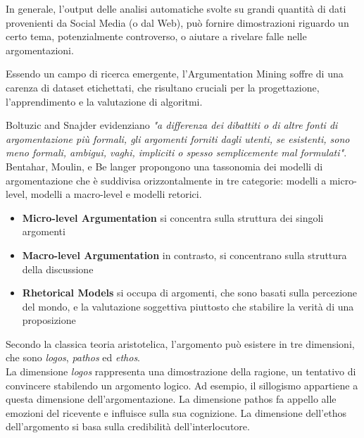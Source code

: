 In generale, l'output delle analisi automatiche svolte su grandi quantità di dati provenienti da Social Media (o dal Web), può fornire dimostrazioni riguardo un certo tema, potenzialmente controverso, o aiutare a rivelare falle nelle argomentazioni.

Essendo un campo di ricerca emergente, l'Argumentation Mining soffre di una carenza di dataset etichettati, che risultano cruciali per la progettazione, l'apprendimento e la valutazione di algoritmi. 



Boltuzic  and Snajder \cite{boltuvzic2014} evidenziano \textit{"a differenza dei dibattiti o di altre fonti di argomentazione più formali, gli argomenti forniti dagli utenti, se esistenti, sono meno formali, ambigui, vaghi, impliciti o spesso semplicemente mal formulati"}. Bentahar, Moulin, e Be langer \cite{bentahar2010} propongono una tassonomia dei modelli di argomentazione che è suddivisa orizzontalmente in tre categorie: modelli a micro-level, modelli a macro-level e modelli retorici.

\begin{itemize}
    \item \textbf{Micro-level Argumentation} si concentra sulla struttura dei singoli argomenti
    \item \textbf{Macro-level Argumentation} in contrasto, si concentrano sulla struttura della discussione
    \item \textbf{Rhetorical Models} si occupa di argomenti, che sono basati sulla percezione del mondo, e la valutazione soggettiva piuttosto che stabilire la verità di una proposizione
\end{itemize}

Secondo la classica teoria aristotelica, l'argomento può esistere in tre dimensioni, che sono \textit{logos}, \textit{pathos} ed \textit{ethos}. \\
La dimensione \textit{logos} rappresenta una dimostrazione della ragione, un tentativo di convincere stabilendo un argomento logico. Ad esempio, il sillogismo appartiene a questa dimensione dell'argomentazione. La dimensione pathos fa appello alle emozioni del ricevente e influisce sulla sua cognizione. La dimensione dell'ethos dell'argomento si basa sulla credibilità dell'interlocutore.


